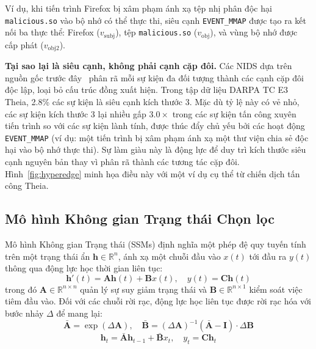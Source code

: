 \documentclass[letterpaper,twocolumn,10pt]{article}
\begin{document}
Ví dụ, khi tiến trình Firefox bị xâm phạm ánh xạ tệp nhị phân độc hại \texttt{malicious.so} vào bộ nhớ có thể thực thi, siêu cạnh \texttt{EVENT\_MMAP} được tạo ra kết nối ba thực thể: Firefox ($v_{\text{subj}}$), tệp \texttt{malicious.so} ($v_{\text{obj}}$), và vùng bộ nhớ được cấp phát ($v_{\text{obj2}}$).

\textbf{Tại sao lại là siêu cạnh, không phải cạnh cặp đôi.} Các NIDS dựa trên nguồn gốc trước đây~\cite{cheng2024kairos,jia2024magic,rehman2024flash,Wang2021THREATRACEDA} phân rã mỗi sự kiện đa đối tượng thành các cạnh cặp đôi độc lập, loại bỏ cấu trúc đồng xuất hiện. Trong tập dữ liệu DARPA TC E3 Theia, 2.8\% các sự kiện là siêu cạnh kích thước 3. Mặc dù tỷ lệ này có vẻ nhỏ, các sự kiện kích thước 3 lại nhiều gấp $3.0\times$ trong các sự kiện tấn công xuyên tiến trình so với các sự kiện lành tính, được thúc đẩy chủ yếu bởi các hoạt động \texttt{EVENT\_MMAP} (ví dụ: một tiến trình bị xâm phạm ánh xạ một thư viện chia sẻ độc hại vào bộ nhớ thực thi). Sự làm giàu này là động lực để duy trì kích thước siêu cạnh nguyên bản thay vì phân rã thành các tương tác cặp đôi. Hình~\ref{fig:hyperedge} minh họa điều này với một ví dụ cụ thể từ chiến dịch tấn công Theia.



\subsection{Mô hình Không gian Trạng thái Chọn lọc}
\label{sec:ssm_background}

Mô hình Không gian Trạng thái (SSMs) định nghĩa một phép đệ quy tuyến tính trên một trạng thái ẩn $\mathbf{h} \in \mathbb{R}^n$, ánh xạ một chuỗi đầu vào $x(t)$ tới đầu ra $y(t)$ thông qua động lực học thời gian liên tục:
\begin{equation}
    \mathbf{h}'(t) = \mathbf{A}\mathbf{h}(t) + \mathbf{B}x(t), \quad y(t) = \mathbf{C}\mathbf{h}(t)
\end{equation}
trong đó $\mathbf{A} \in \mathbb{R}^{n \times n}$ quản lý sự suy giảm trạng thái và $\mathbf{B} \in \mathbb{R}^{n \times 1}$ kiểm soát việc tiêm đầu vào. Đối với các chuỗi rời rạc, động lực học liên tục được rời rạc hóa với bước nhảy $\Delta$ để mang lại:
\begin{equation}
    \bar{\mathbf{A}} = \exp(\Delta \mathbf{A}), \quad \bar{\mathbf{B}} = (\Delta \mathbf{A})^{-1}(\bar{\mathbf{A}} - \mathbf{I}) \cdot \Delta \mathbf{B}
\end{equation}
\begin{equation}
    \mathbf{h}_t = \bar{\mathbf{A}} \mathbf{h}_{t-1} + \bar{\mathbf{B}} x_t, \quad y_t = \mathbf{C} \mathbf{h}_t
\end{equation}
\end{document}
